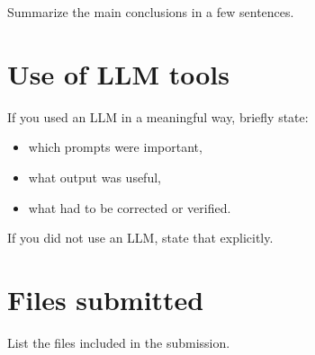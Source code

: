 \documentclass[11pt]{article}
\begin{document}
Summarize the main conclusions in a few sentences.

\section{Use of LLM tools}

If you used an LLM in a meaningful way, briefly state:
\begin{itemize}
  \item which prompts were important,
  \item what output was useful,
  \item what had to be corrected or verified.
\end{itemize}

If you did not use an LLM, state that explicitly.

\section*{Files submitted}

List the files included in the submission.
\end{document}
